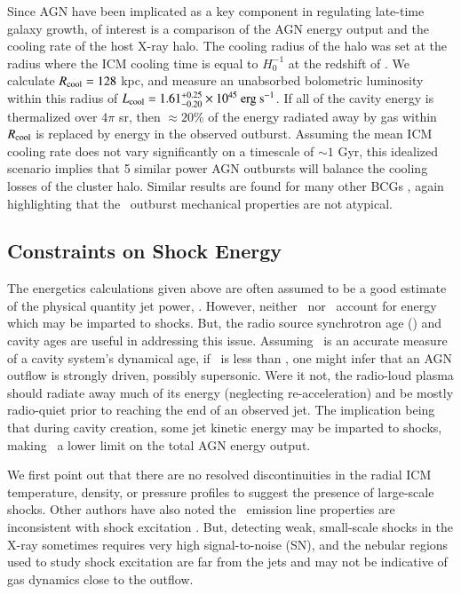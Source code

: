\documentclass[referee,traditabstract]{aa}
\begin{document}
Since AGN have been implicated as a key component in regulating
late-time galaxy growth, of interest is a comparison of the AGN energy
output and the cooling rate of the host X-ray halo. The cooling radius
of the halo was set at the radius where the ICM cooling time is equal
to $H_0^{-1}$ at the redshift of \irs. We calculate $R_{\rm{cool}} =
128$ kpc, and measure an unabsorbed bolometric luminosity within this
radius of $L_{\rm{cool}} = 1.61^{+0.25}_{-0.20} \times 10^{45}
~\rm{\mbox{\ensuremath{\rm{erg}}}~\ensuremath{\rm{\mbox{\ensuremath{\rm{s}}}^{-1}}}}$. If all of the cavity energy is thermalized over $4\pi$ sr,
then $\approx 20\%$ of the energy radiated away by gas within
$R_{\rm{cool}}$ is replaced by energy in the observed
outburst. Assuming the mean ICM cooling rate does not vary
significantly on a timescale of $\sim 1$ Gyr, this idealized scenario
implies that 5 similar power AGN outbursts will balance the cooling
losses of the cluster halo. Similar results are found for many other
BCGs \citep[\eg][]{rafferty06}, again highlighting that the
\irs\ outburst mechanical properties are not atypical.

\subsection{Constraints on Shock Energy}

The energetics calculations given above are often assumed to be a good
estimate of the physical quantity jet power, \pjet. However, neither
\pcav\ nor \pjet\ account for energy which may be imparted to shocks.
But, the radio source synchrotron age (\tsync) and cavity ages are
useful in addressing this issue. Assuming \tsync\ is an accurate
measure of a cavity system's dynamical age, if \tsync\ is less than
\tsonic, one might infer that an AGN outflow is strongly driven,
possibly supersonic. Were it not, the radio-loud plasma should radiate
away much of its energy (neglecting re-acceleration) and be mostly
radio-quiet prior to reaching the end of an observed jet. The
implication being that during cavity creation, some jet kinetic energy
may be imparted to shocks, making \ecav\ a lower limit on the total
AGN energy output.

We first point out that there are no resolved discontinuities in the
radial ICM temperature, density, or pressure profiles to suggest the
presence of large-scale shocks. Other authors have also noted the
\irs\ emission line properties are inconsistent with shock excitation
\citep{1996MNRAS.283.1003C, 2000AJ....120..562T}. But, detecting weak,
small-scale shocks in the X-ray sometimes requires very high
signal-to-noise (SN), and the nebular regions used to study shock
excitation are far from the jets and may not be indicative of gas
dynamics close to the outflow.
\end{document}
